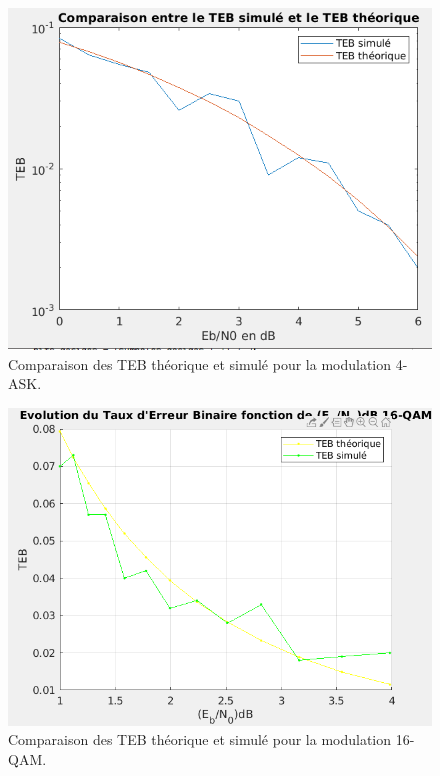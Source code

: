 \documentclass[frenchb]{article}
\begin{document}
\begin{enumerate}
\begin{itemize}
  \begin{figure}[ht!]
    \centering
    \includegraphics[width=12cm]{C34ASKteb.png}
    \caption{Comparaison des TEB théorique et simulé pour la modulation 4-ASK.}
    \label{C33}
 \end{figure}
 
  \begin{figure}[ht!]
    \centering
    \includegraphics[width=12cm]{C316QAMteb.png}
    \caption{Comparaison des TEB théorique et simulé pour la modulation 16-QAM.}
    \label{C34}
 \end{figure}
            
        \end{itemize}
\end{enumerate}

\clearpage
\end{document}
